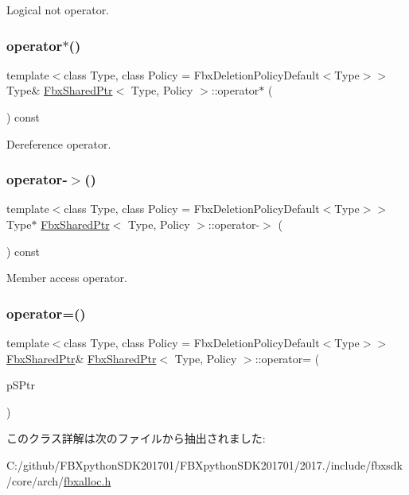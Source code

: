 Logical not operator. 

\mbox{\label{class_fbx_shared_ptr_afc7cbb06097e354e016dbc58a2bd06a4}} 
\subsubsection{\texorpdfstring{operator$\ast$()}{operator*()}}
{\footnotesize\ttfamily template$<$class Type, class Policy = Fbx\+Deletion\+Policy\+Default$<$\+Type$>$$>$ \\
Type\& \hyperlink{class_fbx_shared_ptr}{Fbx\+Shared\+Ptr}$<$ Type, Policy $>$\+::operator$\ast$ (\begin{DoxyParamCaption}{ }\end{DoxyParamCaption}) const}



Dereference operator. 

\mbox{\label{class_fbx_shared_ptr_ab52fbd8433b61e009074282c88814f7c}} 
\subsubsection{\texorpdfstring{operator-\/$>$()}{operator->()}}
{\footnotesize\ttfamily template$<$class Type, class Policy = Fbx\+Deletion\+Policy\+Default$<$\+Type$>$$>$ \\
Type$\ast$ \hyperlink{class_fbx_shared_ptr}{Fbx\+Shared\+Ptr}$<$ Type, Policy $>$\+::operator-\/$>$ (\begin{DoxyParamCaption}{ }\end{DoxyParamCaption}) const}



Member access operator. 

\mbox{\label{class_fbx_shared_ptr_aab1f664cd0b649231f359554129a1dc5}} 
\subsubsection{\texorpdfstring{operator=()}{operator=()}}
{\footnotesize\ttfamily template$<$class Type, class Policy = Fbx\+Deletion\+Policy\+Default$<$\+Type$>$$>$ \\
\hyperlink{class_fbx_shared_ptr}{Fbx\+Shared\+Ptr}\& \hyperlink{class_fbx_shared_ptr}{Fbx\+Shared\+Ptr}$<$ Type, Policy $>$\+::operator= (\begin{DoxyParamCaption}\item[{const \hyperlink{class_fbx_shared_ptr}{Fbx\+Shared\+Ptr}$<$ Type, Policy $>$ \&}]{p\+S\+Ptr }\end{DoxyParamCaption})}



このクラス詳解は次のファイルから抽出されました\+:\begin{DoxyCompactItemize}
\item 
C\+:/github/\+F\+B\+Xpython\+S\+D\+K201701/\+F\+B\+Xpython\+S\+D\+K201701/2017./include/fbxsdk/core/arch/\hyperlink{fbxalloc_8h}{fbxalloc.\+h}\end{DoxyCompactItemize}
